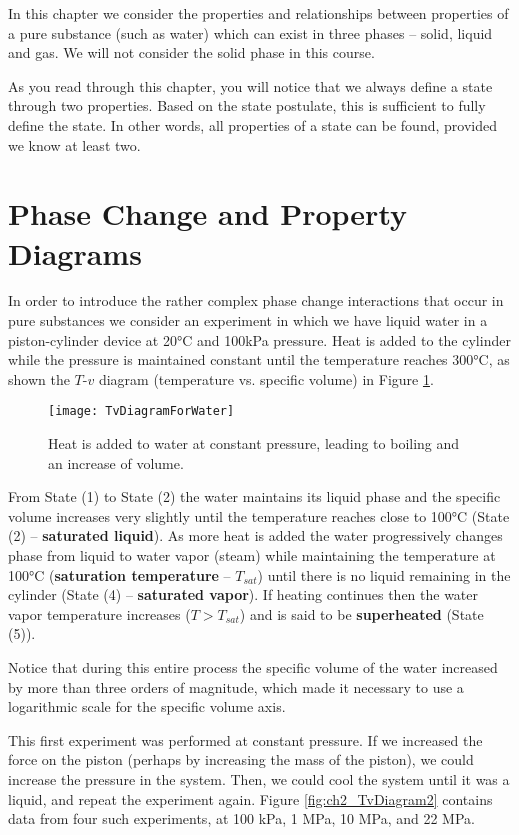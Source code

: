 In this chapter we consider the properties and relationships between properties of a pure substance (such as water) which can exist in three phases – solid, liquid and gas. We will not consider the solid phase in this course.

As you read through this chapter, you will notice that we always define a state through two properties.  Based on the state postulate, this is sufficient to fully define the state.  In other words, all properties of a state can be found, provided we know at least two.
\newpage
\section{Phase Change and Property Diagrams}
In order to introduce the rather complex phase change interactions that occur in pure substances we consider an experiment in which we have liquid water in a piston-cylinder device at 20°C and 100kPa pressure. Heat is added to the cylinder while the pressure is maintained constant until the temperature reaches 300°C, as shown the $T$-$v$ diagram (temperature vs. specific volume) in Figure \ref{fig:ch2_TvDiagram}.

\begin{figure}[H]
\centering
\texttt{[image: TvDiagramForWater]}
\caption{Heat is added to water at constant pressure, leading to boiling and an increase of volume.}
\label{fig:ch2_TvDiagram}
\end{figure}

From State (1) to State (2) the water maintains its liquid phase and the specific volume increases very slightly until the temperature reaches close to 100°C (State (2) – {\bf saturated liquid}). As more heat is added the water progressively changes phase from liquid to water vapor (steam) while maintaining the temperature at 100°C ({\bf saturation temperature} – $T_{sat}$) until there is no liquid remaining in the cylinder (State (4) – {\bf saturated vapor}). If heating continues then the water vapor temperature increases ($T > T_{sat}$) and is said to be {\bf superheated} (State (5)).

Notice that during this entire process the specific volume of the water increased by more than three orders of magnitude, which made it necessary to use a logarithmic scale for the specific volume axis.

This first experiment was performed at constant pressure.  If we increased the force on the piston (perhaps by increasing the mass of the piston), we could increase the pressure in the system.  Then, we could cool the system until it was a liquid, and repeat the experiment again. Figure \ref{fig:ch2_TvDiagram2} contains data from four such experiments, at 100 kPa, 1 MPa, 10 MPa, and 22 MPa.

